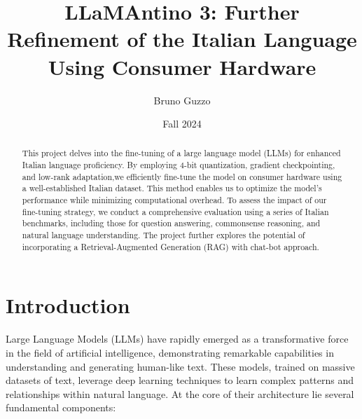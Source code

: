 \documentclass{article}
\title{LLaMAntino 3: Further Refinement of the Italian Language Using Consumer Hardware}
\author{Bruno Guzzo}
\date{Fall 2024}
\begin{document}
	
	\maketitle
	
	\begin{abstract}
		This project delves into the fine-tuning of a large language model (LLMs) for enhanced Italian language proficiency. 
		By employing 4-bit quantization, gradient checkpointing, and low-rank adaptation,we efficiently fine-tune the model on consumer hardware using a well-established Italian dataset.
		This method enables us to optimize the model's performance while minimizing computational overhead.
		To assess the impact of our fine-tuning strategy, we conduct a comprehensive evaluation using a series of Italian benchmarks, including those for question answering, commonsense reasoning, and natural language understanding.
		The project further explores the potential of incorporating a Retrieval-Augmented Generation (RAG) with chat-bot approach.
	\end{abstract}
	
	\section{Introduction}
		Large Language Models (LLMs) have rapidly emerged as a transformative force in the field of artificial intelligence, demonstrating remarkable capabilities in understanding and generating human-like text. 
		These models, trained on massive datasets of text, leverage deep learning techniques to learn complex patterns and relationships within natural language. 
		At the core of their architecture lie several fundamental components:
		
\end{document}

